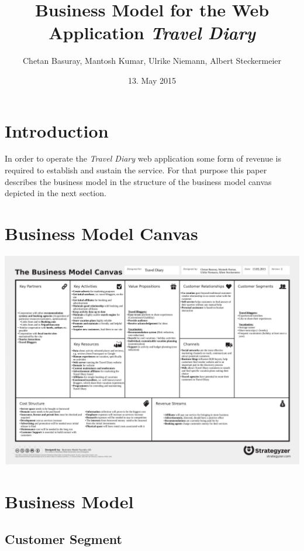 \documentclass[IN,english]{tumbook}
\title{Business Model for the Web Application \emph{Travel Diary}}
\author{Chetan Basuray, Mantosh Kumar, Ulrike Niemann, Albert Steckermeier}
\date{13. May 2015}
\begin{document}
\maketitle
\newpage
\tableofcontents
\newpage

\chapter{Introduction}

In order to operate the \emph{Travel Diary} web application some form of revenue is required to establish and sustain the service. For that purpose this paper describes the business model in the structure of the business model canvas depicted in the next section.

\chapter{Business Model Canvas}


	\begin{center}
		\includegraphics[scale=0.17, angle=90]{graphics/team-39-exercise-2-business-model-canvas}
	\end{center}

\chapter{Business Model}


\section{Customer Segment}
\end{document}
